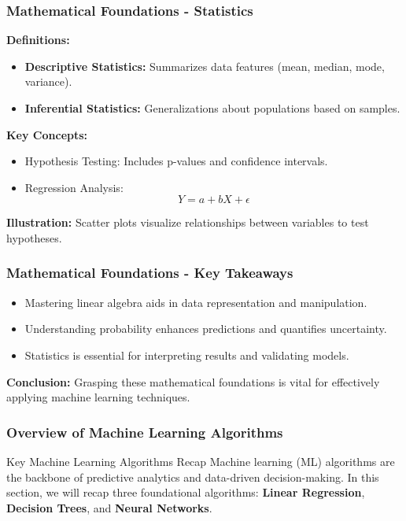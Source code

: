 \documentclass[aspectratio=169]{beamer}
\begin{document}
\begin{frame}[fragile]
    \frametitle{Mathematical Foundations - Statistics}
    \textbf{Definitions:}
    \begin{itemize}
        \item \textbf{Descriptive Statistics:} Summarizes data features (mean, median, mode, variance).
        \item \textbf{Inferential Statistics:} Generalizations about populations based on samples.
    \end{itemize}
    
    \textbf{Key Concepts:}
    \begin{itemize}
        \item Hypothesis Testing: Includes p-values and confidence intervals.
        \item Regression Analysis: 
        \begin{equation}
            Y = a + bX + \epsilon
        \end{equation}
    \end{itemize}
    
    \textbf{Illustration:} Scatter plots visualize relationships between variables to test hypotheses.
\end{frame}

\begin{frame}[fragile]
    \frametitle{Mathematical Foundations - Key Takeaways}
    \begin{itemize}
        \item Mastering linear algebra aids in data representation and manipulation.
        \item Understanding probability enhances predictions and quantifies uncertainty.
        \item Statistics is essential for interpreting results and validating models.
    \end{itemize}
    
    \textbf{Conclusion:} 
    Grasping these mathematical foundations is vital for effectively applying machine learning techniques.
\end{frame}

\begin{frame}[fragile]
    \frametitle{Overview of Machine Learning Algorithms}
    \begin{block}{Key Machine Learning Algorithms Recap}
        Machine learning (ML) algorithms are the backbone of predictive analytics and data-driven decision-making. 
        In this section, we will recap three foundational algorithms: 
        \textbf{Linear Regression}, \textbf{Decision Trees}, and \textbf{Neural Networks}.
    \end{block}
\end{frame}
\end{document}
